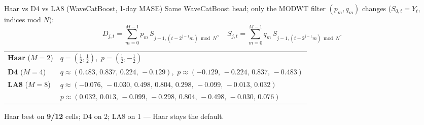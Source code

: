 \begin{frame}{Haar vs D4 vs LA8 (WaveCatBoost, 1-day MASE)}
  {\scriptsize
  Same WaveCatBoost head; only the MODWT filter $(p_m,q_m)$ changes
  ($S_{0,t}=Y_t$, indices mod $N$):
  \[
    D_{j,t}=\sum_{m=0}^{M-1}p_m\,S_{j-1,(t-2^{j-1}m)\bmod N},\quad
    S_{j,t}=\sum_{m=0}^{M-1}q_m\,S_{j-1,(t-2^{j-1}m)\bmod N}.
  \]
  }
  {\tiny
  \centering
  \renewcommand{\arraystretch}{1.15}
  \begin{tabular}{@{}l@{\hspace{0.6em}}l@{}}
    \textbf{Haar} ($M{=}2$) &
      $q=(\tfrac12,\tfrac12)$,\ $p=(\tfrac12,-\tfrac12)$ \\
    \textbf{D4} ($M{=}4$) &
      $q\approx(0.483,\,0.837,\,0.224,\,-0.129)$,\
      $p\approx(-0.129,\,-0.224,\,0.837,\,-0.483)$ \\
    \textbf{LA8} ($M{=}8$) &
      $q\approx(-0.076,\,-0.030,\,0.498,\,0.804,\,0.298,\,-0.099,\,-0.013,\,0.032)$ \\
      & $p\approx(0.032,\,0.013,\,-0.099,\,-0.298,\,0.804,\,-0.498,\,-0.030,\,0.076)$ \\
  \end{tabular}
  }
  \vspace{0.25em}
  {\tiny
  \centering
  }
  \vspace{0.2em}
  {\scriptsize
  Haar best on \textbf{9/12} cells; D4 on 2; LA8 on 1 --- Haar stays the default.
  }
\end{frame}


